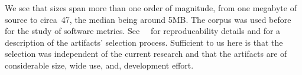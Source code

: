 We see that sizes span more than one order of magnitude, from one megabyte of
source to circa~47, the median being around 5MB. The corpus was used before for 
the study of software metrics. See~\cite{Gil:Lalouche:2016}~\cite{Matteo:Cite:Gal:SecondPaper} for
reproducability details and for a description of the artifacts' selection
process.  Sufficient to us here is that the selection was independent of the
current research and that the artifacts are of considerable size, wide
use, and, development effort.
